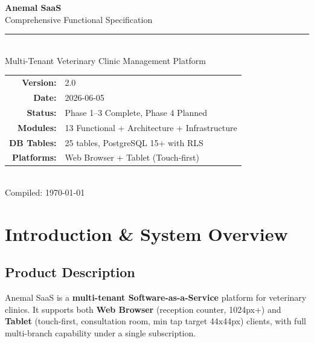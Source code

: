 \documentclass[12pt,a4paper]{report}
\begin{document}
\begin{titlepage}
\pagecolor{branddark}\color{white}
\vspace*{36mm}
\begin{center}
  {\fontsize{40}{46}\selectfont\bfseries Anemal SaaS}\\[5mm]
  {\fontsize{20}{26}\selectfont Comprehensive Functional Specification}\\[4mm]
  {\color{brandlight}\rule{110mm}{1.5pt}}\\[6mm]
  {\large Multi-Tenant Veterinary Clinic Management Platform}\\[12mm]
  \begin{tabular}{rl}
    \textbf{Version:}      & 2.0 \\[2pt]
    \textbf{Date:}         & 2026-06-05 \\[2pt]
    \textbf{Status:}       & Phase 1--3 Complete, Phase 4 Planned \\[2pt]
    \textbf{Modules:}      & 13 Functional + Architecture + Infrastructure \\[2pt]
    \textbf{DB Tables:}    & 25 tables, PostgreSQL 15+ with RLS \\[2pt]
    \textbf{Platforms:}    & Web Browser + Tablet (Touch-first) \\
  \end{tabular}\\[14mm]
  {\color{muted}\small Compiled: \today}
\end{center}
\end{titlepage}
\pagecolor{white}\color{black}
\setcounter{tocdepth}{2}
\tableofcontents
\clearpage

\chapter{Introduction \& System Overview}

\section{Product Description}

Anemal SaaS is a \textbf{multi-tenant Software-as-a-Service} platform for veterinary clinics. It supports both \textbf{Web Browser} (reception counter, 1024px+) and \textbf{Tablet} (touch-first, consultation room, min tap target 44x44px) clients, with full multi-branch capability under a single subscription.
\end{document}
